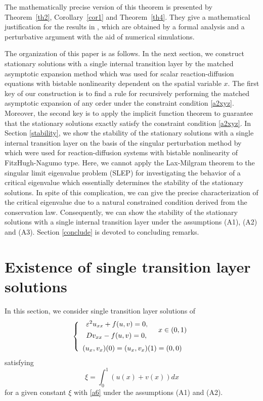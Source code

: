 \documentclass[a4,10pt]{article}
\begin{document}
The mathematically precise version of this theorem is presented by Theorem~\ref{th2},
Corollary~\ref{cor1} and Theorem~\ref{th4}.
They give a mathematical justification for the results in 
\cite{MJE1, MJE2}, which are obtained by a formal analysis and 
a perturbative argument with the aid of numerical simulations.

The organization of this paper is as follows.
In the next section, we construct stationary solutions with a single internal transition layer
by the matched asymptotic expansion method \cite{I} which was used for
scalar reaction-diffusion equations with bistable nonlinearity dependent on
the spatial variable $x$. 
The first key of our construction is to find a rule for recursively performing
the matched asymptotic expansion of any order under the constraint condition \eqref{a2xyz}.
Moreover, the second key is to apply the implicit function
theorem to guarantee that the stationary solutions exactly satisfy the constraint condition \eqref{a2xyz}. 
In Section \ref{stability}, we show the stability of the stationary solutions with a single internal
transition layer on the basis of the singular perturbation method by \cite{HS, NF} which were used for
reaction-diffusion systems with bistable nonlinearity of FitzHugh-Nagumo type.
Here, we cannot apply 
the Lax-Milgram theorem
to the singular limit eigenvalue problem (SLEP) for investigating the behavior of
a critical eigenvalue which essentially determines
the stability of the stationary solutions. 
In spite of this complication, we can give the precise characterization of the critical eigenvalue due to a natural constrained condition 
derived from the conservation law.
Consequently, we can show the stability of the 
stationary solutions with a single internal transition layer under 
the assumptions (A1), (A2) and (A3).
Section \ref{conclude} is devoted to concluding remarks.







\section{Existence of single transition layer solutions } \label{existence} %


\noindent
In this section, we consider single transition layer solutions of 
%
\begin{equation}\label{b1}
\left \{
\begin{array}{l}
\begin{array}{l}
\varepsilon^2 u_{xx} +  f(u,v) = 0, \\[1ex]
Dv_{xx}  - f(u, v) = 0, 
\end{array} \quad  x \in (0,1) \\[0.5cm]
(u_x, v_x)(0) = (u_x, v_x)(1) = (0, 0)
\end{array} 
\right.
\end{equation}
%
satisfying 
%
\begin{equation}\label{b1_1}
\xi = \int_0^1 \left( u(x) + v(x) \right) dx 
\end{equation}
%
for a given constant $\xi$ with \eqref{a6} 
under the assumptions (A1) and (A2).
\end{document}
